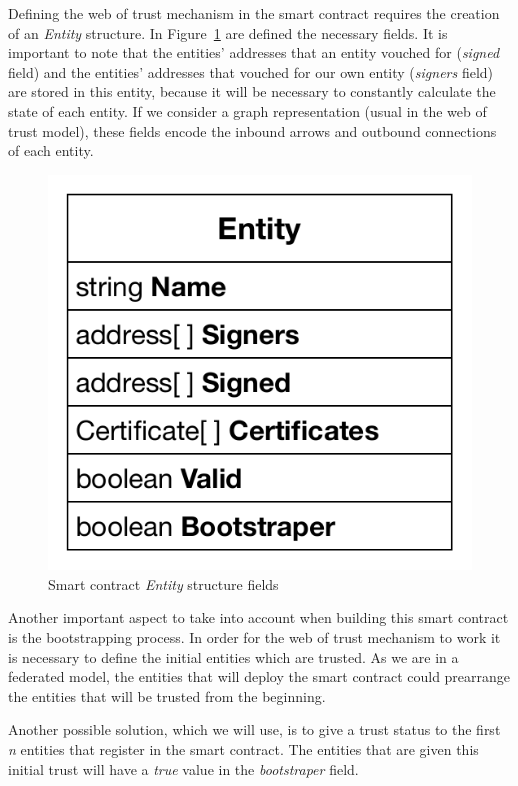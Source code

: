 Defining the web of trust mechanism in the smart contract requires the creation of an \textit{Entity} structure.
In Figure~\ref{fig:entity-structure} are defined the necessary fields.
It is important to note that the entities' addresses that an entity vouched for (\textit{signed} field) and the entities' addresses that vouched for our own entity (\textit{signers} field) are stored in this entity, because it will be necessary to constantly calculate the state of each entity.
If we consider a graph representation (usual in the web of trust model), these fields encode the inbound arrows and outbound connections of each entity.

\begin{figure}[htb]
  \centering
  \includegraphics[scale=0.5]{Figures/entity-structure.pdf}
  \caption{Smart contract \textit{Entity} structure fields}
\label{fig:entity-structure}
\end{figure}

Another important aspect to take into account when building this smart contract is the bootstrapping process.
In order for the web of trust mechanism to work it is necessary to define the initial entities which are trusted.
As we are in a federated model, the entities that will deploy the smart contract could prearrange the entities that will be trusted from the beginning.

Another possible solution, which we will use, is to give a trust status to the first \textit{n} entities that register in the smart contract.
The entities that are given this initial trust will have a \textit{true} value in the \textit{bootstraper} field.

